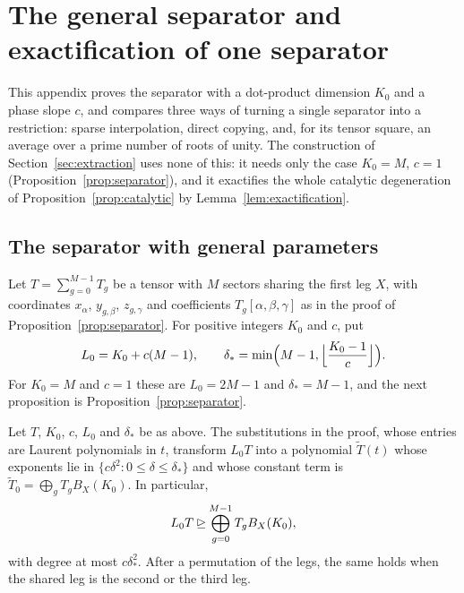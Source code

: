 \section{The general separator and exactification of one separator}
\label{subsec:sparse}

This appendix proves the separator with a dot-product dimension \(K_0\)
and a phase slope \(c\), and compares three ways of turning a single
separator into a restriction: sparse interpolation, direct copying, and,
for its tensor square, an average over a prime number of roots of unity.
The construction of Section~\ref{sec:extraction} uses none of this: it
needs only the case \(K_0=M\), \(c=1\) (Proposition~\ref{prop:separator}),
and it exactifies the whole catalytic degeneration of
Proposition~\ref{prop:catalytic} by Lemma~\ref{lem:exactification}.

\subsection{The separator with general parameters}

Let \(T=\sum_{g=0}^{M-1}T_g\) be a tensor with \(M\) sectors sharing the
first leg \(X\), with coordinates \(x_\alpha\), \(y_{g,\beta}\),
\(z_{g,\gamma}\) and coefficients \(T_g[\alpha,\beta,\gamma]\) as in the
proof of Proposition~\ref{prop:separator}. For positive integers \(K_0\)
and \(c\), put
\begin{equation}\label{eq:separator-parameters}
 L_0=K_0+c(M-1),\qquad
 \delta_*=\min\Bigl(M-1,\Bigl\lfloor\frac{K_0-1}{c}\Bigr\rfloor\Bigr).
\end{equation}
For \(K_0=M\) and \(c=1\) these are \(L_0=2M-1\) and \(\delta_*=M-1\), and
the next proposition is Proposition~\ref{prop:separator}.

\begin{proposition}\label{prop:separator-general}
Let \(T\), \(K_0\), \(c\), \(L_0\) and \(\delta_*\) be as above. The
substitutions in the proof, whose entries are Laurent polynomials in
\(t\), transform \(L_0T\) into a polynomial \(\widetilde T(t)\) whose
exponents lie in \(\{c\delta^2:0\le\delta\le\delta_*\}\) and whose
constant term is \(\widetilde T_0=\bigoplus_gT_gB_X(K_0)\). In particular,
\begin{equation}\label{eq:separator-general}
 L_0T\unrhd\bigoplus_{g=0}^{M-1}T_gB_X(K_0),
\end{equation}
with degree at most \(c\delta_*^2\). After a permutation of the legs, the
same holds when the shared leg is the second or the third leg.
\end{proposition}

